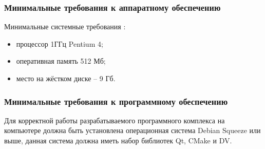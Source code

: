 \subsubsection {Минимальные требования к аппаратному обеспечению}
Минимальные системные требования \cite{debian_8}:

\begin{itemize}
\item процессор 1ГГц Pentium 4;
\item оперативная память 512 Мб;
\item место на жёстком диске -- 9 Гб.
\end{itemize}

\subsubsection {Минимальные требования к программному обеспечению}
Для корректной работы разрабатываемого программного комплекса на компьютере должна быть установлена операционная система Debian Squeeze или выше, данная система должна иметь набор библиотек Qt, CMake и DV.